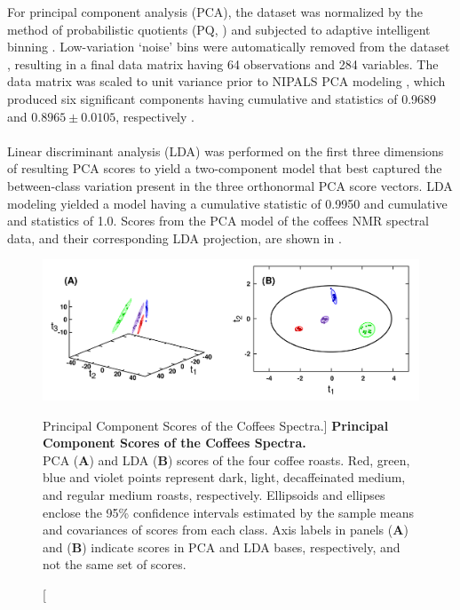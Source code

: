 \begin{doublespace}
For principal component analysis (PCA), the dataset was normalized by the
method of probabilistic quotients (PQ, \cite{dieterle:anchem2006}) and
subjected to adaptive intelligent binning \cite{demeyer:anchem2008}.
Low-variation `noise' bins were automatically removed from the dataset
\cite{zhang:opin2008}, resulting in a final data matrix having 64 observations
and 284 variables. The data matrix was scaled to unit variance
\cite{vandenberg:bmcg2006} prior to NIPALS PCA modeling \cite{jolliffe2002},
which produced six significant components having cumulative \rsqx{} and
\qsq{} statistics of 0.9689 and $0.8965 \pm 0.0105$, respectively
\cite{eshghi:cils2014}.
\\\\
Linear discriminant analysis (LDA) was performed on the first three dimensions
of resulting PCA scores to yield a two-component model that best
captured the between-class variation present in the three orthonormal PCA
score vectors. LDA modeling yielded a model having a cumulative \rsqx{}
statistic of 0.9950 and cumulative \rsqy{} and \qsq{} statistics of 1.0.
Scores from the PCA model of the coffees \hnmr{} NMR spectral data, and
their corresponding LDA projection, are shown in .
\end{doublespace}

\begin{figure}[ht!]
\includegraphics[width=6in]{figs/apps/03-pca-lda.png}
\caption
      [Principal Component Scores of the Coffees Spectra.]{
  {\bf Principal Component Scores of the Coffees Spectra.}
  \\
  PCA ({\bf A}) and LDA ({\bf B}) scores of the four coffee roasts. Red,
  green, blue and violet points represent dark, light, decaffeinated medium,
  and regular medium roasts, respectively. Ellipsoids and ellipses enclose
  the 95\% confidence intervals estimated by the sample means and covariances
  of scores from each class. Axis labels in panels ({\bf A}) and ({\bf B})
  indicate scores in PCA and LDA bases, respectively, and not the same set
  of scores.
}
\label{figure.4.3}
\end{figure}

